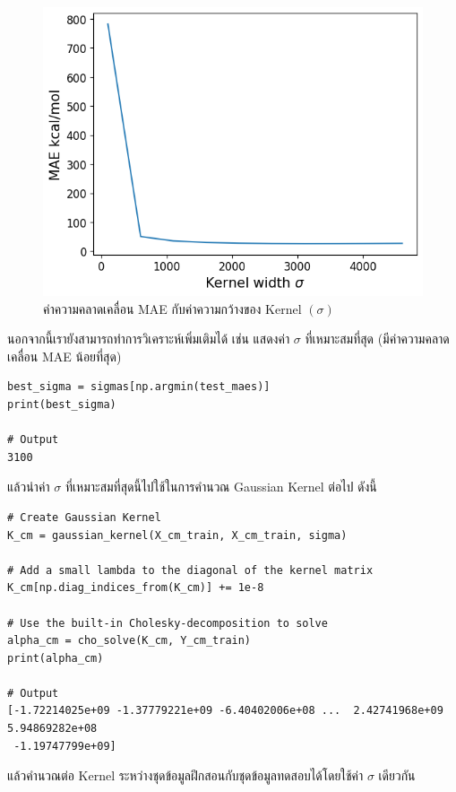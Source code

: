 \begin{figure}[H]
    \centering
    \includegraphics[width=0.8\linewidth]{fig/qm9_cm_mae_sigma.png}
    \caption{ค่าความคลาดเคลื่อน MAE กับค่าความกว้างของ Kernel $(\sigma)$}
    \label{fig:qm9_cm_kernel_mae}
\end{figure}

นอกจากนี้เรายังสามารถทำการวิเคราะห์เพิ่มเติมได้ เช่น แสดงค่า $\sigma$ ที่เหมาะสมที่สุด (มีค่าความคลาดเคลื่อน MAE น้อยที่สุด)

\begin{lstlisting}[style=MyPython]
best_sigma = sigmas[np.argmin(test_maes)]
print(best_sigma)

# Output
3100
\end{lstlisting}

\vspace{1em}

\noindent แล้วนำค่า $\sigma$ ที่เหมาะสมที่สุดนี้ไปใช้ในการคำนวณ Gaussian Kernel ต่อไป ดังนี้

\begin{lstlisting}[style=MyPython]
# Create Gaussian Kernel
K_cm = gaussian_kernel(X_cm_train, X_cm_train, sigma)

# Add a small lambda to the diagonal of the kernel matrix
K_cm[np.diag_indices_from(K_cm)] += 1e-8

# Use the built-in Cholesky-decomposition to solve
alpha_cm = cho_solve(K_cm, Y_cm_train)
print(alpha_cm)

# Output
[-1.72214025e+09 -1.37779221e+09 -6.40402006e+08 ...  2.42741968e+09  5.94869282e+08
 -1.19747799e+09]
\end{lstlisting}

\vspace{1em}

\noindent แล้วคำนวณต่อ Kernel ระหว่างชุดข้อมูลฝึกสอนกับชุดข้อมูลทดสอบได้โดยใช้ค่า $\sigma$ เดียวกัน

